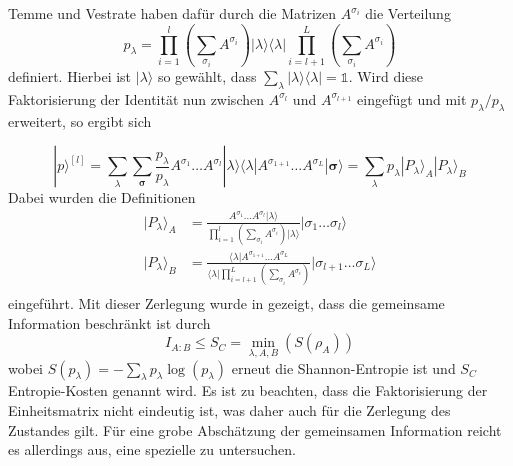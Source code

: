 \documentclass[10pt,a4paper]{report}
\begin{document}
Temme und Vestrate haben dafür durch die Matrizen $A^{\sigma_i}$ die Verteilung 
\begin{equation}
p_{\lambda}=\prod_{i=1}^l(\sum_{\sigma_i}A^{\sigma_i})|\lambda\rangle\langle\lambda|\prod_{i=l+1}^L(\sum_{\sigma_i}A^{\sigma_i})
\end{equation}
definiert. Hierbei ist  $|\lambda\rangle$ so gewählt, dass $\sum_{\lambda}|\lambda\rangle\langle\lambda|=\mathbb{1}$. Wird diese Faktorisierung der Identität nun zwischen $A^{\sigma_l}$ und $A^{\sigma_{l+1}}$ eingefügt und mit $p_{\lambda}/p_{\lambda}$ erweitert, so ergibt sich


\begin{equation}
|p\rangle^{[l]}=\sum_{\lambda}\sum_{\bm{\sigma}}\frac{p_{\lambda}}{p_{\lambda}}A^{\sigma_1}\ldots A^{\sigma_l}|\lambda\rangle\langle\lambda|A^{\sigma_{1+1}}\ldots A^{\sigma_L}|\bm{\sigma}\rangle=\sum_{\lambda}p_{\lambda}|P_{\lambda}\rangle_A|P_{\lambda}\rangle_B
\end{equation}
Dabei wurden die Definitionen
\begin{equation}
\begin{split}
|P_{\lambda}\rangle_A&=\frac{A^{\sigma_1}\ldots A^{\sigma_l}|\lambda\rangle}{\prod_{i=1}^l(\sum_{\sigma_i}A^{\sigma_i})|\lambda\rangle}|\sigma_1\ldots\sigma_l\rangle\\
|P_{\lambda}\rangle_B&=\frac{\langle\lambda|A^{\sigma_{1+1}}\ldots A^{\sigma_L}}{\langle\lambda|\prod_{i=l+1}^L(\sum_{\sigma_i}A^{\sigma_i})}|\sigma_{l+1}\ldots\sigma_L\rangle\\
\end{split}
\end{equation}
eingeführt. Mit dieser Zerlegung wurde in \cite{sMPS} gezeigt, dass die gemeinsame Information beschränkt ist durch
\begin{equation}
I_{A:B}\leq S_C=\min_{\lambda,A,B}(S(\rho_A))
\end{equation}
wobei $S(p_{\lambda})=-\sum_{\lambda}p_{\lambda}\log(p_{\lambda})$ erneut die Shannon-Entropie ist und $S_C$ Entropie-Kosten genannt wird. Es ist zu beachten, dass die Faktorisierung der Einheitsmatrix nicht eindeutig ist, was daher auch für die Zerlegung des Zustandes gilt. Für eine grobe Abschätzung der gemeinsamen Information reicht es allerdings aus, eine spezielle zu untersuchen.
\end{document}
